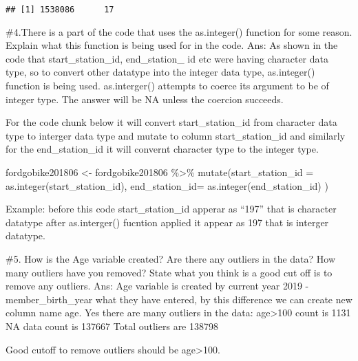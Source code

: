 \documentclass[]{article}
\newenvironment{Shaded}{\begin{snugshade}}{\end{snugshade}}
\newcommand{\DecValTok}[1]{\textcolor[rgb]{0.00,0.00,0.81}{#1}}
\newcommand{\KeywordTok}[1]{\textcolor[rgb]{0.13,0.29,0.53}{\textbf{#1}}}
\newcommand{\NormalTok}[1]{#1}
\newcommand{\OperatorTok}[1]{\textcolor[rgb]{0.81,0.36,0.00}{\textbf{#1}}}
\newcommand{\StringTok}[1]{\textcolor[rgb]{0.31,0.60,0.02}{#1}}
\begin{document}
\begin{verbatim}
## [1] 1538086      17
\end{verbatim}

\newpage

\#4.There is a part of the code that uses the as.integer() function for
some reason. Explain what this function is being used for in the code.
Ans: As shown in the code that start\_station\_id, end\_station\_ id etc
were having character data type, so to convert other datatype into the
integer data type, as.integer() function is being used. as.interger()
attempts to coerce its argument to be of integer type. The answer will
be NA unless the coercion succeeds.

For the code chunk below it will convert start\_station\_id from
character data type to interger data type and mutate to column
start\_station\_id and similarly for the end\_station\_id it will
convernt character type to the integer type.

fordgobike201806 \textless{}- fordgobike201806 \%\textgreater{}\%
mutate(start\_station\_id = as.integer(start\_station\_id),
end\_station\_id= as.integer(end\_station\_id) )

Example: before this code start\_station\_id apperar as ``197'' that is
character datatype after as.interger() fucntion applied it appear as 197
that is interger datatype.

\newpage

\#5. How is the Age variable created? Are there any outliers in the
data? How many outliers have you removed? State what you think is a good
cut off is to remove any outliers. Ans: Age variable is created by
current year 2019 - member\_birth\_year what they have entered, by this
difference we can create new column name age. Yes there are many
outliers in the data: age\textgreater{}100 count is 1131 NA data count
is 137667 Total outliers are 138798

Good cutoff to remove outliers should be age\textgreater{}100.

\begin{Shaded}
\end{Shaded}
\end{document}
